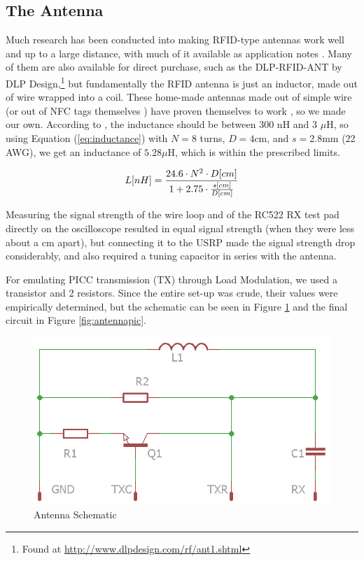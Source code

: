 \documentclass[fleqn,10pt]{SelfArx} %
\begin{document}
\subsection{The Antenna}
\label{subsec:antenna}

Much research has been conducted into making RFID-type antennas work well and up to a large distance, with much of it available as application notes \cite{mifare, antenna, pnantenna}. Many of them are also available for direct purchase, such as the DLP-RFID-ANT by DLP Design,\footnote{Found at \url{http://www.dlpdesign.com/rf/ant1.shtml}} but fundamentally the RFID antenna is just an inductor, made out of wire wrapped into a coil. These home-made antennas made out of simple wire (or out of NFC tags themselves \cite{nfcantenna}) have proven themselves to work \cite{wireantenna}, so we made our own. According to \cite{pnantenna}, the inductance should be between 300 nH and 3 $\mu$H, so using Equation (\ref{eq:inductance}) with $N=8$ turns, $D=4$cm, and $s=2.8$mm (22 AWG), we get an inductance of $5.28 \mu$H, which is within the prescribed limits.

\begin{equation}
\label{eq:inductance}
\hfill L [nH] = \frac{24.6 \cdot N^2\cdot D[cm]}{1+2.75\cdot\frac{s[cm]}{D[cm]}}\hspace*{\fill}
\end{equation}

Measuring the signal strength of the wire loop and of the RC522 RX test pad directly on the oscilloscope resulted in equal signal strength (when they were less about a cm apart), but connecting it to the USRP made the signal strength drop considerably, and also required a tuning capacitor in series with the antenna. 

For emulating PICC transmission (TX) through Load Modulation, we used a transistor and 2 resistors. Since the entire set-up was crude, their values were empirically determined, but the schematic can be seen in Figure \ref{fig:antennaschematic} and the final circuit in Figure \ref{fig:antennapic}.

\begin{figure}[h]
  \includegraphics[width=\linewidth]{img/antennaschematic}
  \caption{Antenna Schematic}
  \label{fig:antennaschematic}
\end{figure}
\end{document}
